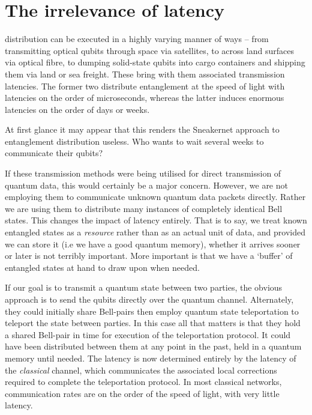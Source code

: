%
%

\section{The irrelevance of latency}

 distribution can be executed in a highly varying manner of ways -- from transmitting optical qubits through space via satellites, to across land surfaces via optical fibre, to dumping solid-state qubits into cargo containers and shipping them via land or sea freight. These bring with them associated transmission latencies. The former two distribute entanglement at the speed of light with latencies on the order of microseconds, whereas the latter induces enormous latencies on the order of days or weeks.

At first glance it may appear that this renders the Sneakernet\texttrademark{} approach to entanglement distribution useless. Who wants to wait several weeks to communicate their qubits?

If these transmission methods were being utilised for direct transmission of quantum data, this would certainly be a major concern. However, we are not employing them to communicate unknown quantum data packets directly. Rather we are using them to distribute many instances of completely identical Bell states. This changes the impact of latency entirely. That is to say, we treat known entangled states as a \textit{resource} rather than as an actual unit of data, and provided we can store it (i.e we have a good quantum memory), whether it arrives sooner or later is not terribly important. More important is that we have a `buffer' of entangled states at hand to draw upon when needed.

If our goal is to transmit a quantum state between two parties, the obvious approach is to send the qubits directly over the quantum channel. Alternately, they could initially share Bell-pairs then employ quantum state teleportation to teleport the state between parties. In this case all that matters is that they hold a shared Bell-pair in time for execution of the teleportation protocol. It could have been distributed between them at any point in the past, held in a quantum memory until needed. The latency is now determined entirely by the latency of the \textit{classical} channel, which communicates the associated local corrections required to complete the teleportation protocol. In most classical networks, communication rates are on the order of the speed of light, with very little latency.

